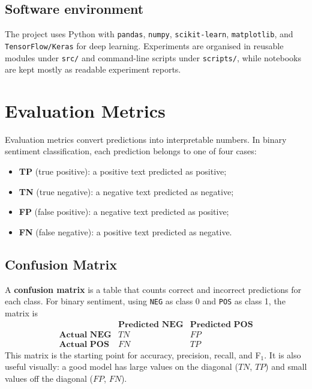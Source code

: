 \documentclass[11pt,a4paper]{report}
\begin{document}
\section{Software environment}

The project uses Python with \texttt{pandas}, \texttt{numpy}, \texttt{scikit-learn}, \texttt{matplotlib}, and \texttt{TensorFlow/Keras} for deep learning. Experiments are organised in reusable modules under \texttt{src/} and command-line scripts under \texttt{scripts/}, while notebooks are kept mostly as readable experiment reports.

\chapter{Evaluation Metrics}

Evaluation metrics convert predictions into interpretable numbers. In binary sentiment classification, each prediction belongs to one of four cases:
\begin{itemize}[noitemsep]
    \item \textbf{TP} (true positive): a positive text predicted as positive;
    \item \textbf{TN} (true negative): a negative text predicted as negative;
    \item \textbf{FP} (false positive): a negative text predicted as positive;
    \item \textbf{FN} (false negative): a positive text predicted as negative.
\end{itemize}

\section{Confusion Matrix}

A \textbf{confusion matrix} is a table that counts correct and incorrect predictions for each class. For binary sentiment, using \texttt{NEG} as class 0 and \texttt{POS} as class 1, the matrix is
\[
\begin{array}{c|cc}
 & \textbf{Predicted NEG} & \textbf{Predicted POS} \\
\hline
\textbf{Actual NEG} & TN & FP \\
\textbf{Actual POS} & FN & TP
\end{array}
\]
This matrix is the starting point for accuracy, precision, recall, and F$_1$. It is also useful visually: a good model has large values on the diagonal ($TN$, $TP$) and small values off the diagonal ($FP$, $FN$).
\end{document}
